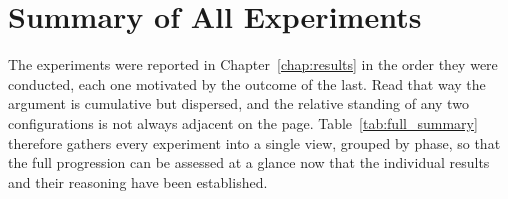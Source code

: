 \section{Summary of All Experiments}
\label{app:tab_summary}

The experiments were reported in Chapter~\ref{chap:results} in the order they were conducted, each
one motivated by the outcome of the last. Read that way the argument is cumulative but dispersed,
and the relative standing of any two configurations is not always adjacent on the page.
Table~\ref{tab:full_summary} therefore gathers every experiment into a single view, grouped by
phase, so that the full progression can be assessed at a glance now that the individual results and
their reasoning have been established.

\begin{table}[htbp]
    \centering
    \caption[Summary of all experiments]{Summary of all experiments grouped by phase: baselines, initial Query2Doc experiments, and expanded experiments covering query repetition, hybrid fusion, and CSQE. Bold values indicate the best result for each metric across all experiments.}
    \label{tab:full_summary}
\end{table}
